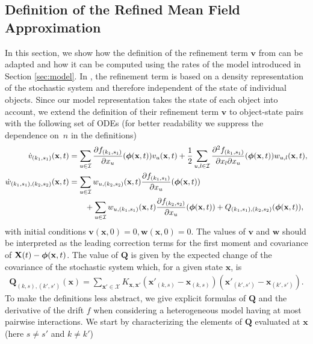\documentclass[acmsmall]{acmart}
\newcommand\bx{\mathbf{x}}
\newcommand\bX{\mathbf{X}}
\newcommand\bv{\mathbf{v}}
\newcommand\bw{\mathbf{w}}
\newcommand\bdrift{f}
\newcommand\bphi{\text{\boldmath$\phi$}}
\newcommand\bQ{\mathbf{Q}}
\newcommand\calX{\mathcal{X}}
\newcommand\calI{\mathcal{I}}
\begin{document}
\subsection{Definition of the Refined Mean Field Approximation}
\label{apx:rmf_def}

In this section, we show how the definition of the refinement term $\bv$ from \cite{gastSizeExpansionsMean2019} can be adapted and how it can be computed using the rates of the model introduced in Section \ref{sec:model}. In \cite{gastSizeExpansionsMean2019}, the refinement term is based on a density representation of the stochastic system and therefore independent of the state of individual objects. Since our model representation takes the state of each object into account, we extend the definition of their refinement term $\bv$ to object-state pairs with the following set of ODEs (for better readability we suppress the dependence on~$n$ in the definitions)
\begin{align*}
\dot{v}_{(k_1,s_1)}(\bx,t) &= \sum_{u \in \calI} \frac{\partial \bdrift_{(k_1,s_1)}}{\partial x_u}(\bphi(\bx,t)) v_{u}(\bx,t) + \frac{1}{2}\sum_{u,l \in \calI} \frac{\partial^2\bdrift_{(k_1,s_1)}}{\partial x_l \partial x_u}(\bphi(\bx,t))w_{u,l}(\bx,t), \\
\dot{w}_{(k_1,s_1),(k_2,s_2)}(\bx,t) &= \sum_{u \in \calI}w_{u,(k_2,s_2)}(\bx,t) \frac{\partial \bdrift_{(k_1,s_1)}}{\partial x_{u}}(\bphi(\bx,t))  \\
& \qquad + \sum_{u \in \calI}w_{u,(k_1,s_1)}(\bx,t) \frac{\partial \bdrift_{(k_2,s_2)}}{\partial x_u}(\bphi(\bx,t)) + Q_{(k_1,s_1),(k_2,s_2)}(\bphi(\bx,t)),
\end{align*}
with initial conditions $\bv(\bx, 0) = 0, \bw(\bx, 0) = 0$. The values of $\bv$ and $\bw$ should be interpreted as the leading correction terms for the first moment and covariance of $\bX(t) - \bphi(\bx,t)$. The value of $\bQ$ is given by the expected change of the covariance of the stochastic system which, for a given state $\bx$, is
\begin{align*}
  \bQ_{(k,s),(k',s')}(\bx) = \sum_{\bx'\in\calX} K_{\bx,\bx'}(\bx'_{(k,s)}-\bx_{(k,s)})(\bx'_{(k',s')}-\bx_{(k',s')}).
\end{align*}
To make the definitions less abstract, we give explicit formulas of $\bQ$ and the derivative of the drift $f$ when considering a heterogeneous model having at most pairwise interactions. We start by characterizing the elements of $\bQ$ evaluated at $\bx$ (here $s\ne s'$ and $k\ne k'$) 
\end{document}
